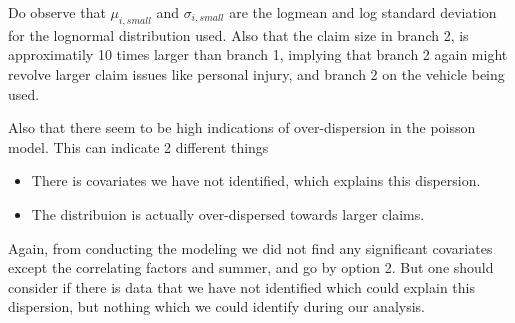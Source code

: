 \documentclass[11pt]{article}
\begin{document}
\begin{table}[h!]
  \centering
  \qquad %
  \caption{Model parameters for claim severity and claim frequency.}
  \label{a4:parameters}
\end{table}

Do observe that $\mu_{i,small}$ and $\sigma_{i,small}$ are the logmean and log standard deviation for the lognormal distribution used.
Also that the claim size in branch 2, is approximatily 10 times larger than branch 1, implying that branch 2 again might revolve larger claim issues like personal injury, and branch 2 on the vehicle being used.

Also that there seem to be high indications of over-dispersion in the poisson model.
This can indicate 2 different things
\begin{itemize}
    \item There is covariates we have not identified, which explains this dispersion.
    \item The distribuion is actually over-dispersed towards larger claims.
\end{itemize}

Again, from conducting the modeling we did not find any significant covariates except the correlating factors and summer, and go by option 2.
But one should consider if there is data that we have not identified which could explain this dispersion, but nothing which we could identify during our analysis.
\end{document}
